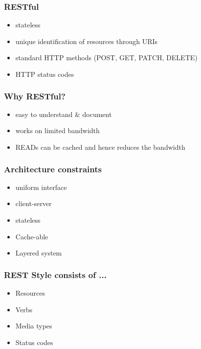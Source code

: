 \documentclass[aspectratio=169]{beamer}
\begin{document}
\begin{frame}[fragile]
  \frametitle{RESTful}

  \begin{itemize}
  \item stateless
  \item unique identification of resources through URIs
  \item standard HTTP methods (POST, GET, PATCH, DELETE)
  \item HTTP status codes
  \end{itemize}
  
\end{frame}

\begin{frame}[fragile]
  \frametitle{Why RESTful?}

  \begin{itemize}
  \item easy to understand \& document
  \item works on limited bandwidth
  \item READs can be cached and hence reduces the bandwidth
  \end{itemize}
  
\end{frame}

\begin{frame}[fragile]
  \frametitle{Architecture constraints}

  \begin{itemize}
  \item uniform interface
  \item client-server
  \item stateless
  \item Cache-able
  \item Layered system
  \end{itemize}
  
\end{frame}

\begin{frame}[fragile]
  \frametitle{REST Style consists of ...}

  \begin{itemize}
  \item Resources
  \item Verbs
  \item Media types
  \item Status codes
  \end{itemize}
  
\end{frame}
\end{document}
